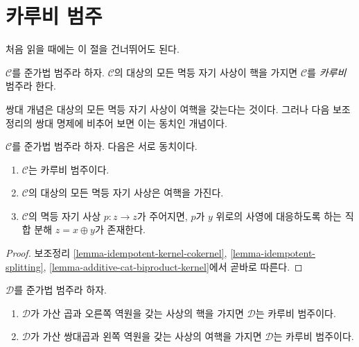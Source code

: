 \section{카루비 범주}
\label{section-karoubian}

\noindent
처음 읽을 때에는 이 절을 건너뛰어도 된다.

\begin{definition}
\label{definition-karoubian}
$\mathcal{C}$를 준가법 범주라 하자. $\mathcal{C}$의 대상의 모든 멱등
자기 사상이 핵을 가지면 $\mathcal{C}$를 {\it 카루비} 범주라 한다.
\end{definition}

\noindent
쌍대 개념은 대상의 모든 멱등 자기 사상이 여핵을 갖는다는 것이다.
그러나 다음 보조정리의 쌍대 명제에 비추어 보면 이는 동치인 개념이다.

\begin{lemma}
\label{lemma-karoubian}
$\mathcal{C}$를 준가법 범주라 하자. 다음은 서로 동치이다.
\begin{enumerate}
\item $\mathcal{C}$는 카루비 범주이다.
\item $\mathcal{C}$의 대상의 모든 멱등 자기 사상은 여핵을 가진다.
\item $\mathcal{C}$의 멱등 자기 사상 $p : z \to z$가 주어지면,
$p$가 $y$ 위로의 사영에 대응하도록 하는 직합 분해 $z = x \oplus y$가
존재한다.
\end{enumerate}
\end{lemma}

\begin{proof}
보조정리 \ref{lemma-idempotent-kernel-cokernel},
\ref{lemma-idempotent-splitting}, \ref{lemma-additive-cat-biproduct-kernel}에서
곧바로 따른다.
\end{proof}

\begin{lemma}
\label{lemma-projectors-have-images}
$\mathcal{D}$를 준가법 범주라 하자.
\begin{enumerate}
\item $\mathcal{D}$가 가산 곱과 오른쪽 역원을 갖는 사상의 핵을 가지면
$\mathcal{D}$는 카루비 범주이다.
\item $\mathcal{D}$가 가산 쌍대곱과 왼쪽 역원을 갖는 사상의 여핵을 가지면
$\mathcal{D}$는 카루비 범주이다.
\end{enumerate}
\end{lemma}

